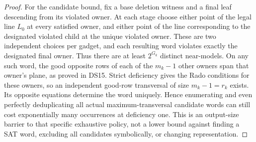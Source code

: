 \documentclass[11pt]{article}
\begin{document}
\begin{proof}
For the candidate bound, fix a base deletion witness and a final leaf descending from its violated owner. At each stage choose either point of the legal line $L_0$ at every satisfied owner, and either point of the line corresponding to the designated violated child at the unique violated owner. These are two independent choices per gadget, and each resulting word violates exactly the designated final owner. Thus there are at least $2^{G_k}$ distinct near-models. On any such word, the good opposite rows of each of the $m_k-1$ other owners span that owner's plane, as proved in DS15. Strict deficiency gives the Rado conditions for these owners, so an independent good-row transversal of size $m_k-1=r_k$ exists. Its opposite equations determine the word uniquely. Hence enumerating and even perfectly deduplicating all actual maximum-transversal candidate words can still cost exponentially many occurrences at deficiency one. This is an output-size barrier to that specific exhaustive policy, not a lower bound against finding a SAT word, excluding all candidates symbolically, or changing representation.
\end{proof}
\end{document}
